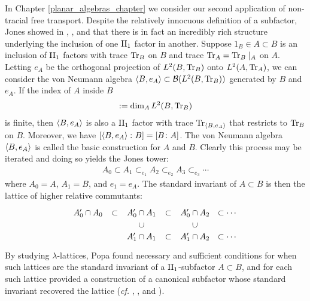In Chapter \ref{planar_algebras_chapter} we consider our second application of non-tracial free transport. Despite the relatively innocuous definition of a subfactor, Jones showed in \cite{Jon83}, \cite{Jon99}, and \cite{Jon00} that there is in fact an incredibly rich structure underlying the inclusion of one $\text{II}_1$ factor in another. Suppose $1_B\in A\subset B$ is an inclusion of $\text{II}_1$ factors with trace $\text{Tr}_B$ on $B$ and trace $\text{Tr}_A=\text{Tr}_B\mid_A$ on $A$. Letting $e_A$ be the orthogonal projection of $L^2(B,\text{Tr}_B)$ onto $L^2(A,\text{Tr}_A)$, we can consider the von Neumann algebra $\left\langle B,e_A\right\rangle\subset \mathcal{B}(L^2(B,\text{Tr}_B))$ generated by $B$ and $e_A$. If the index of $A$ inside $B$
	\begin{align*}
		[B\colon A]:=\dim_A L^2(B,\Tr_B)
	\end{align*}
is finite, then $\left\langle B,e_A\right\rangle$ is also a $\text{II}_1$ factor with trace $\text{Tr}_{\left\langle B,e_A\right\rangle}$ that restricts to $\text{Tr}_B$ on $B$. Moreover, we have $[\left\langle B,e_A\right\rangle\colon B]=[B\colon A]$. The von Neumann algebra $\left\langle B,e_A\right\rangle$ is called the basic construction for $A$ and $B$. Clearly this process may be iterated and doing so yields the Jones tower:
	\begin{align*}
		A_0 \subset A_1 \subset_{e_1} A_2 \subset_{e_2} A_3 \subset_{e_3} \cdots
	\end{align*}
where $A_0=A$, $A_1=B$, and $e_1=e_A$. The standard invariant of $A\subset B$ is then the lattice of higher relative commutants:
	\[
	\begin{tikzpicture}[thick, scale=.5]
	\node at (0,0) {$A_0'\cap A_0$};
	
	\node at (2.25,0) {$\subset$};
	
	\node at (4.5, 0) {$A_0'\cap A_1$};
	\node at (4.5,-1) {\rotatebox{90}{$\subset$}};
	\node at (4.5,-2) {$A_1'\cap A_1$};
	
	\node at (6.75,0) {$\subset$};
	\node at (6.75,-2) {$\subset$};
	
	\node at (9,0) {$A_0'\cap A_2$};
	\node at (9,-1) {\rotatebox{90}{$\subset$}};
	\node at (9,-2) {$A_1'\cap A_2$};
	
	\node at (11.75,0) {$\subset\cdots $};
	\node at (11.75,-2) {$\subset\cdots $};
	
	\end{tikzpicture}
	\]
By studying $\lambda$-lattices, Popa found necessary and sufficient conditions for when such lattices are the standard invariant of a $\text{II}_1$-subfactor $A\subset B$, and for each such lattice provided a construction of a canonical subfactor whose standard invariant recovered the lattice (\emph{cf.} \cite{Pop93}, \cite{Pop95}, and \cite{Pop02}).

